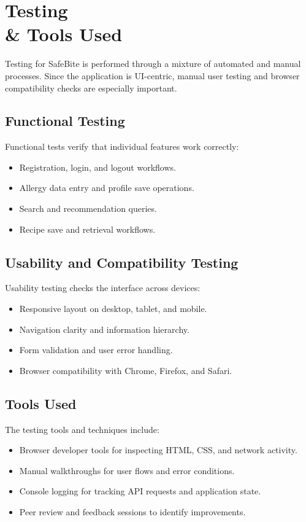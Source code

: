 \documentclass[12pt,a4paper]{report}
\begin{document}
\chapter{Testing \\& Tools Used}
Testing for SafeBite is performed through a mixture of automated and manual processes. Since the application is UI-centric, manual user testing and browser compatibility checks are especially important.

\section{Functional Testing}
Functional tests verify that individual features work correctly:
\begin{itemize}
  \item Registration, login, and logout workflows.
  \item Allergy data entry and profile save operations.
  \item Search and recommendation queries.
  \item Recipe save and retrieval workflows.
\end{itemize}

\section{Usability and Compatibility Testing}
Usability testing checks the interface across devices:
\begin{itemize}
  \item Responsive layout on desktop, tablet, and mobile.
  \item Navigation clarity and information hierarchy.
  \item Form validation and user error handling.
  \item Browser compatibility with Chrome, Firefox, and Safari.
\end{itemize}

\section{Tools Used}
The testing tools and techniques include:
\begin{itemize}
  \item Browser developer tools for inspecting HTML, CSS, and network activity.
  \item Manual walkthroughs for user flows and error conditions.
  \item Console logging for tracking API requests and application state.
  \item Peer review and feedback sessions to identify improvements.
\end{itemize}
\end{document}
